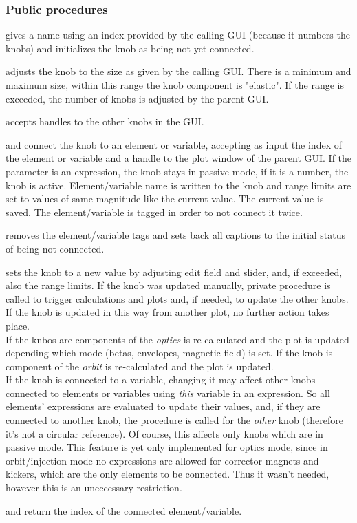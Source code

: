 \documentclass[12pt]{article}
\newcommand\code[1]{{\tt #1}}
\newcommand\guifco[1]{{\color{violet}\code{#1}}}
\newcommand{\opagui}[1]{\colorbox{blue!20}{{\color{black}\code{#1}}}}
\newcommand{\ogui}[1]{\hyperref[#1]{\opagui{#1}}}
\newcommand{\ppro}[1]{\subsubsection*{Public procedures} #1}
\newcommand{\todo}[1]{{\color{red} #1}}
\begin{document}
\ppro{
\guifco{Init} gives a name using an index provided by the calling GUI (because it numbers the knobs) and initializes the knob as being not yet connected.

\guifco{SetSize} adjusts the knob to the size as given by the calling GUI. There is a minimum and maximum size, within this range the knob component is "elastic". If the range is exceeded, the number of knobs is adjusted by the parent GUI.

\guifco{Brotherhandles} accepts handles to the other knobs in the GUI.

\guifco{Load} and \guifco{LoadVar} connect the knob to an element or variable, accepting as input the index of the element or variable and a handle to the plot window of the parent GUI. If the parameter is an expression, the knob stays in passive mode, if it is a number, the knob is active. Element/variable name is written to the knob and range limits are set to values of same magnitude like the current value. The current value is saved. The element/variable is tagged in order to not connect it twice.

\guifco{UnLoad} removes the element/variable tags and sets back all captions to the initial status of being not connected.

\guifco{KUpdate} sets the knob to a new value by adjusting edit field and slider, and, if exceeded, also the range limits. If the knob was updated manually, private procedure \guifco{Action} is called to trigger calculations and plots and, if needed, to update the other knobs. If the knob is updated in this way from another plot, no further action takes place.\\
If the knbos are components of \ogui{opalinop} the {\em optics} is re-calculated and the plot is updated depending which mode (betas, envelopes, magnetic field) is set.
If the knob is component of \ogui{opaorbit} the {\em orbit} is re-calculated and the plot is updated.\\
If the knob is connected to a variable, changing it may affect other knobs connected to elements or variables using {\em this} variable in an expression. So all elements' expressions are evaluated to update their values, and, if they are connected to another knob, the \guifco{KUpdate} procedure is called for the {\em other} knob (therefore it's not a circular reference). Of course, this affects only knobs which are in passive mode. \todo{This feature is yet only implemented for optics mode, since in orbit/injection mode no expressions are allowed for corrector magnets and kickers, which are the only elements to be connected. Thus it wasn't needed, however this is an uneccessary restriction.}

\guifco{getella} and \guifco{getvar} return the index of the connected element/variable.
}
\end{document}
